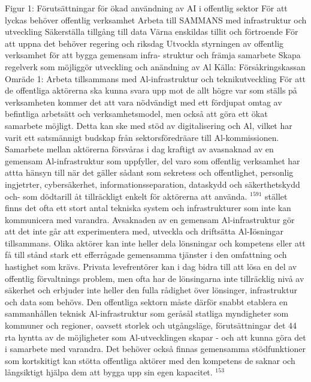 {{{{{{{{{{{{{{{Figur 1: Förutsättningar för ökad användning av AI i offentlig sektor
För att lyckas behöver offentlig
verksamhet
Arbeta till SAMMANS med
infrastruktur och utveckling
Säkerställa tillgång till data
Värna enskildas tillit och förtroende
För att uppna det behöver
regering och riksdag
Utvockla styrningen av
offentlig verksamhet för
att bygga gemensam infra-
struktur och främja samarbete
Skapa regelverk som
möjliggör utveckling och
anändning av Al
Källa: Försåkringskassan
Omräde 1: Arbeta tillsammans med Al-infrastruktur och teknikutveckling
För att de offentliga aktörerna ska kunna svara upp mot de allt högre var som ställs på verksamheten kommer det att vara nödvändigt med ett fördjupat omtag av befintliga arbetsätt och verksamhetsmodel, men också att göra ett ökat samarbete möjligt. Detta kan ske med stöd av digitalisering och Al, vilket har varit ett satsmännigt budskap från sektorsföredräare till Al-kommissionen.
Samarbete mellan aktörerna försvåras i dag kraftigt av avasnaknad av en gemensam Al-infrastruktur som uppfyller, del varo som offentlig verksamhet har attta hänsyn till när det gäller sådant som sekretess och offentlighet, personlig ingjetrter, cybersäkerhet, informationsseparation, dataskydd och säkerthetskydd och- som dödtarill åt tillräckligt enkelt för aktörerna att använda. \({ }^{1591}\) stället finns det ofta ett stort antal tekniska system och infrastrukturer som inte kan kommunicera med varandra.
Avsaknaden av en gemensam Al-infrastruktur gör att det inte går att experimentera med, utveckla och driftsätta Al-Iösningar tillsammans. Olika aktörer kan inte heller dela lönsningar och kompetens eller att få till stånd stark ett efferrågade gemensamma tjänster i den omfattning och hastighet som krävs. Privata levefrentörer kan i dag bidra till att lösa en del av offentlig förvaltnings problem, men ofta har de lönsingarna
inte tillräcklig nivå av säkerhet och erbjuder inte heller den fulla rådighet över lönsinger, infrastruktur och data som behövs.
Den offentliga sektorn måste därför snabbt etablera en sammanhållen teknisk Al-infrastruktur som geråsål statliga myndigheter som kommuner och regioner, oavsett storlek och utgångsläge, förutsättningar det 44 rta hyntta av de möjligheter som Al-utvecklingen skapar - och att kunna göra det i samarbete med varandra. Det behöver också finnas gemensamma stödfunktioner som kortskitigt kan stötta offentliga aktörer med den kompetens de saknar och långsiktigt hjälpa dem att bygga upp sin egen kapacitet. \({ }^{153}\)
}}}}}}}}}}}}}}}
